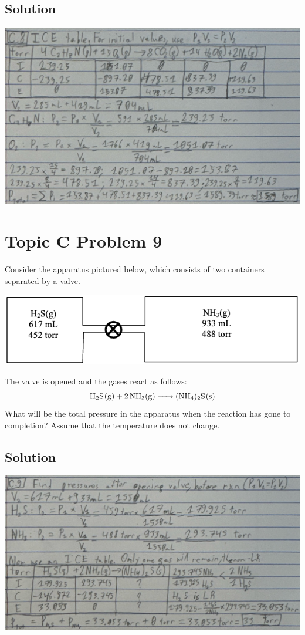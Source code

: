 \documentclass[10pt]{article}
\begin{document}
        \subsection{Solution}
            \begin{center}
                \includegraphics[width=\textwidth]{Answers Images/answer_C_8.jpg}
            \end{center}

    \pagebreak
    \section{Topic C Problem 9}
        Consider the apparatus pictured below, which consists of two containers separated by a valve.
        \begin{center}
            \includegraphics{picture_C-9.png}
        \end{center}
        The valve is opened and the gases react as follows:
        \begin{equation}
            \ce{H2S(g) + 2 NH3(g) -> (NH4)2S(s)}
        \end{equation}
        What will be the total pressure in the apparatus when the reaction has gone to completion?
        Assume that the temperature does not change.

        \subsection{Solution}
            \begin{center}
                \includegraphics[width=\textwidth]{Answers Images/answer_C_9.jpg}
            \end{center}

    \pagebreak

    \tableofcontents
\end{document}
